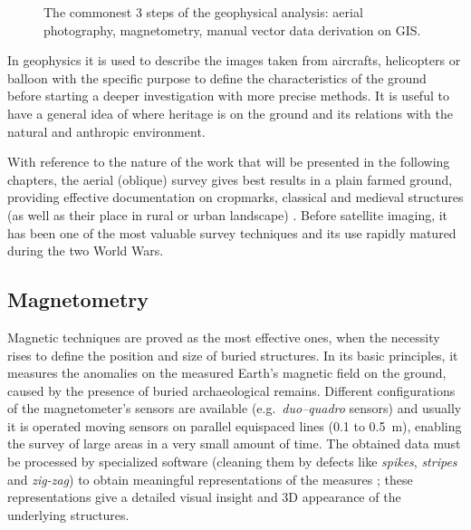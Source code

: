             \begin{wrapfigure}{l}{0.4\textwidth}
                \centering
                \vspace{-0.02\textheight}
                
                \caption[The commontest 3 steps of the geophysical analysis.]{The commonest 3 steps of the geophysical analysis: aerial photography, magnetometry, manual vector data derivation on GIS.}
                \label{fig:magn-circles}
                \vspace{-0.14\textheight}
            \end{wrapfigure}

            In geophysics it is used to describe the images taken from aircrafts, helicopters or balloon with the specific purpose to define the characteristics of the ground before starting a deeper investigation with more precise methods.
            It is useful to have a general idea of where heritage is on the ground and its relations with the natural and anthropic environment.

            With reference to the nature of the work that will be presented in the following chapters, the aerial (oblique) survey gives best results in a plain farmed ground, providing effective documentation on cropmarks, classical and medieval structures (as well as their place in rural or urban landscape) \cite[pp.~11--12]{arch-site-detection}. Before satellite imaging, it has been one of the most valuable survey techniques and its use rapidly matured during the two World Wars.
            
        \subsection{Magnetometry}
            Magnetic techniques are proved as the most effective ones, when the necessity rises to define the position and size of buried structures. In its basic principles, it measures the anomalies on the measured Earth's magnetic field on the ground, caused by the presence of buried archaeological remains. Different configurations of the magnetometer's sensors are available (e.g.\ \emph{duo--quadro} sensors) and usually it is operated moving sensors on parallel equispaced lines (\num{0.1} to \SI{0.5}{\meter}), enabling the survey of large areas in a very small amount of time. The obtained data must be processed by specialized software (cleaning them by defects like \emph{spikes}, \emph{stripes} and \emph{zig-zag}) to obtain meaningful representations of the measures \cite[p.~462]{terrestrial-remote}; these representations give a detailed visual insight and 3D appearance of the underlying structures.

